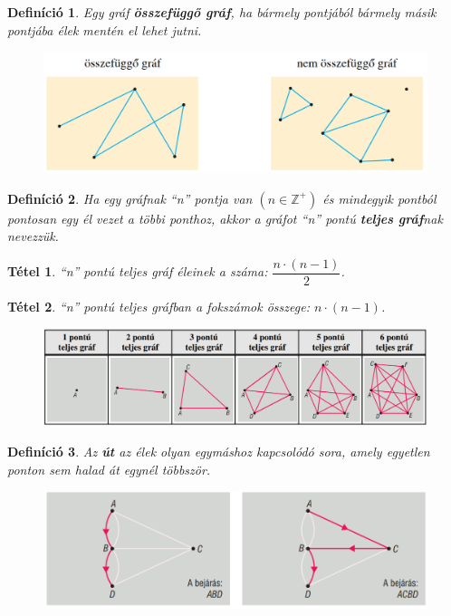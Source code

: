 \documentclass[12pt,a4paper]{article}
\newtheorem{theorem}{Tétel} [section]
\newtheorem{definition}{Definíció} [section]
\begin{document}
\begin{definition}
Egy gráf \textbf{összefüggő gráf}, ha bármely pontjából bármely másik pontjába élek mentén el lehet jutni.
\end{definition}
\begin{figure}[h]
\centering
\includegraphics[scale=0.3]{geometry/osszefuggo_graf}
\end{figure}

\begin{definition}
Ha egy gráfnak ``n'' pontja van $(n\in \mathbb{Z}^+)$ és mindegyik pontból pontosan egy él vezet a többi ponthoz, akkor a gráfot ``n'' pontú \textbf{teljes gráf}nak nevezzük.
\end{definition}

\begin{theorem}
``n'' pontú teljes gráf éleinek a száma: $\dfrac{n\cdot (n-1)}{2}$.
\end{theorem}

\begin{theorem}
``n'' pontú teljes gráfban a fokszámok összege: $n\cdot (n-1)$.
\end{theorem}

\begin{figure}[h]
\centering
\includegraphics[width=\textwidth]{geometry/teljes_grafok}
\end{figure}
\newpage
\begin{definition}
Az \textbf{út} az élek olyan egymáshoz kapcsolódó sora, amely egyetlen ponton sem halad át egynél többször.
\begin{figure}[h]
\centering
\includegraphics[scale=0.3]{geometry/graf_ut}
\end{figure}
\end{definition}
\end{document}
